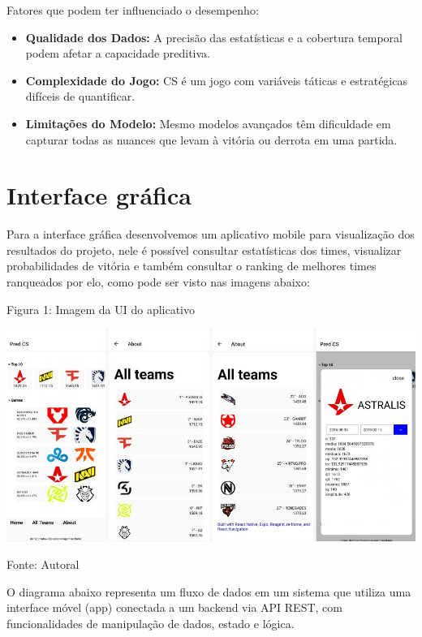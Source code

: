 \documentclass[a4paper,times,12pt]{article}
\begin{document}
Fatores que podem ter influenciado o desempenho:
\begin{itemize}
  \item \textbf{Qualidade dos Dados:} A precisão das estatísticas e a cobertura temporal podem afetar a capacidade preditiva.
  \item \textbf{Complexidade do Jogo:} CS é um jogo com variáveis táticas e estratégicas difíceis de quantificar.
  \item \textbf{Limitações do Modelo:} Mesmo modelos avançados têm dificuldade em capturar todas as nuances que levam à vitória ou derrota em uma partida.
\end{itemize}


\section {Interface gráfica}
\hspace{+15pt}
Para a interface gráfica desenvolvemos um aplicativo mobile para visualização dos resultados do projeto, nele é possível consultar estatísticas dos times, visualizar probabilidades de vitória e também consultar o ranking de melhores times ranqueados por elo, como pode ser visto nas imagens abaixo:

\begin{center}
  \caption{Figura 1: Imagem da UI do aplicativo}
  \centering
  \includegraphics[width=16cm]{pred_cs_final.png}
  \label{fig:predicoes_cs_final}
  \caption{Fonte: Autoral}
\end{center}

O diagrama abaixo representa um fluxo de dados em um sistema que utiliza uma interface móvel (app) conectada a um backend via API REST, com funcionalidades de manipulação de dados, estado e lógica.
\end{document}
